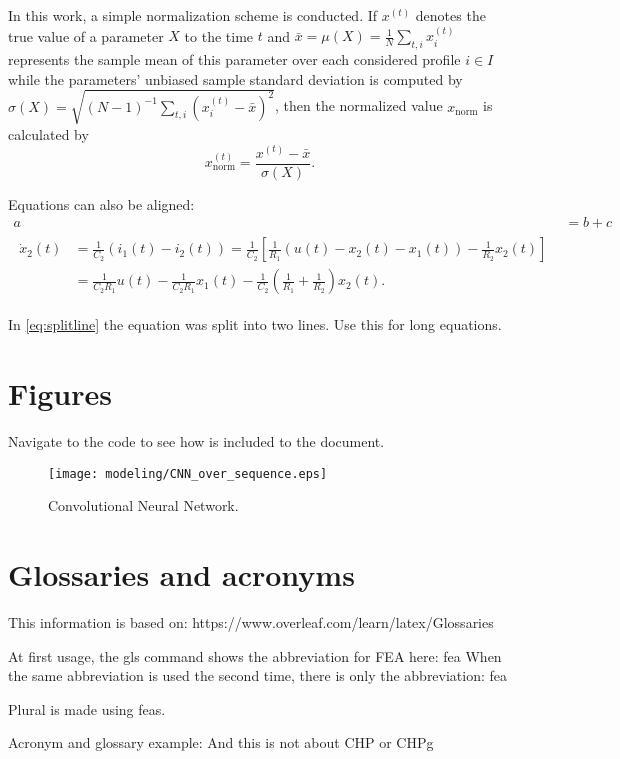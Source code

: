In this work, a simple normalization scheme is conducted.
If $x^{(t)}$ denotes the true value of a parameter $X$ to the time $t$ and $\bar{x} = \mu(X) = \frac{1}{N}\sum\nolimits_{t, i} x^{(t)}_i$ represents the sample mean of this parameter over each considered profile $i\in I$ while the parameters' unbiased sample standard deviation is computed by $\sigma(X)=\sqrt{(N-1)^{-1}\sum\nolimits_{t, i} (x^{(t)}_i - \bar{x})^2}$, then the normalized value $x_\text{norm}$ is calculated by  
\begin{equation}
	x_\text{norm}^{(t)} = \frac{x^{(t)}-\bar{x}}{\sigma(X)}.
\end{equation}

Equations can also be aligned:
\begin{align}
    a&=b+c\\
    \begin{split}
        \dot{x}_2(t)&= \frac{1}{C_2} \left( i_1(t)-i_2(t)\right)= \frac{1}{C_2} \left[ \frac{1}{R_1} \left(u(t)-x_2(t)-x_1(t) \right)-\frac{1}{R_2} x_2(t)\right]\\
        &= \frac{1}{C_2 R_1} u(t)-\frac{1}{C_2 R_1} x_1(t) - \frac{1}{C_2} \left( \frac{1}{R_1}+\frac{1}{R_2}\right) x_2(t). 
        \label{eq:splitline}
    \end{split}
\end{align}

In \eqref{eq:splitline} the equation was split into two lines. Use this for long equations.

\section{Figures}
\label{sec:architecture}
Navigate to the code to see how  is included to the document. 

\begin{figure}[htb]
	\centering
    \texttt{[image: modeling/CNN\_over\_sequence.eps]}
    \caption{Convolutional Neural Network.}
	\label{fig:cnn}
\end{figure}

\section{Glossaries and acronyms}
This information is based on: https://www.overleaf.com/learn/latex/Glossaries

At first usage, the gls command shows the abbreviation for FEA here: 
\gls{fea}
When the same abbreviation is used the second time, there is only the abbreviation: \gls{fea}

Plural is made using \glspl{fea}.

Acronym and glossary example: And this is not about \acrshort{CHP} or \gls{CHPg}
